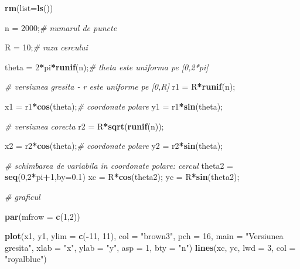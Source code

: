 \documentclass[]{article}
\newenvironment{Shaded}{\begin{snugshade}}{\end{snugshade}}
\newcommand{\KeywordTok}[1]{\textcolor[rgb]{0.13,0.29,0.53}{\textbf{#1}}}
\newcommand{\DataTypeTok}[1]{\textcolor[rgb]{0.13,0.29,0.53}{#1}}
\newcommand{\DecValTok}[1]{\textcolor[rgb]{0.00,0.00,0.81}{#1}}
\newcommand{\FloatTok}[1]{\textcolor[rgb]{0.00,0.00,0.81}{#1}}
\newcommand{\StringTok}[1]{\textcolor[rgb]{0.31,0.60,0.02}{#1}}
\newcommand{\CommentTok}[1]{\textcolor[rgb]{0.56,0.35,0.01}{\textit{#1}}}
\newcommand{\OperatorTok}[1]{\textcolor[rgb]{0.81,0.36,0.00}{\textbf{#1}}}
\newcommand{\NormalTok}[1]{#1}
\begin{document}
\begin{Shaded}
\begin{Highlighting}[]
\KeywordTok{rm}\NormalTok{(}\DataTypeTok{list=}\KeywordTok{ls}\NormalTok{())}

\NormalTok{n =}\StringTok{ }\DecValTok{2000}\NormalTok{;}\CommentTok{# numarul de puncte}

\NormalTok{R =}\StringTok{ }\DecValTok{10}\NormalTok{;}\CommentTok{# raza cercului }

\NormalTok{theta =}\StringTok{ }\DecValTok{2}\OperatorTok{*}\NormalTok{pi}\OperatorTok{*}\KeywordTok{runif}\NormalTok{(n);}\CommentTok{# theta este uniforma pe [0,2*pi]}

\CommentTok{# versiunea gresita - r este uniforme pe [0,R]}
\NormalTok{r1 =}\StringTok{ }\NormalTok{R}\OperatorTok{*}\KeywordTok{runif}\NormalTok{(n);}

\NormalTok{x1 =}\StringTok{ }\NormalTok{r1}\OperatorTok{*}\KeywordTok{cos}\NormalTok{(theta);}\CommentTok{# coordonate polare}
\NormalTok{y1 =}\StringTok{ }\NormalTok{r1}\OperatorTok{*}\KeywordTok{sin}\NormalTok{(theta);}

\CommentTok{# versiunea corecta}
\NormalTok{r2 =}\StringTok{ }\NormalTok{R}\OperatorTok{*}\KeywordTok{sqrt}\NormalTok{(}\KeywordTok{runif}\NormalTok{(n));}

\NormalTok{x2 =}\StringTok{ }\NormalTok{r2}\OperatorTok{*}\KeywordTok{cos}\NormalTok{(theta);}\CommentTok{# coordonate polare}
\NormalTok{y2 =}\StringTok{ }\NormalTok{r2}\OperatorTok{*}\KeywordTok{sin}\NormalTok{(theta);}

\CommentTok{# schimbarea de variabila in coordonate polare: cercul}
\NormalTok{theta2 =}\StringTok{ }\KeywordTok{seq}\NormalTok{(}\DecValTok{0}\NormalTok{,}\DecValTok{2}\OperatorTok{*}\NormalTok{pi}\OperatorTok{+}\DecValTok{1}\NormalTok{,}\DataTypeTok{by=}\FloatTok{0.1}\NormalTok{) }
\NormalTok{xc =}\StringTok{ }\NormalTok{R}\OperatorTok{*}\KeywordTok{cos}\NormalTok{(theta2);}
\NormalTok{yc =}\StringTok{ }\NormalTok{R}\OperatorTok{*}\KeywordTok{sin}\NormalTok{(theta2);}

\CommentTok{# graficul}

\KeywordTok{par}\NormalTok{(}\DataTypeTok{mfrow =} \KeywordTok{c}\NormalTok{(}\DecValTok{1}\NormalTok{,}\DecValTok{2}\NormalTok{))}

\KeywordTok{plot}\NormalTok{(x1, y1,}
     \DataTypeTok{ylim =} \KeywordTok{c}\NormalTok{(}\OperatorTok{-}\DecValTok{11}\NormalTok{, }\DecValTok{11}\NormalTok{),}
     \DataTypeTok{col =} \StringTok{"brown3"}\NormalTok{, }\DataTypeTok{pch =} \DecValTok{16}\NormalTok{,}
     \DataTypeTok{main =} \StringTok{"Versiunea gresita"}\NormalTok{, }\DataTypeTok{xlab =} \StringTok{"x"}\NormalTok{, }\DataTypeTok{ylab =} \StringTok{"y"}\NormalTok{, }\DataTypeTok{asp =} \DecValTok{1}\NormalTok{, }\DataTypeTok{bty =} \StringTok{"n"}\NormalTok{)}
\KeywordTok{lines}\NormalTok{(xc, yc, }\DataTypeTok{lwd =} \DecValTok{3}\NormalTok{, }\DataTypeTok{col =} \StringTok{"royalblue"}\NormalTok{)}


\end{Highlighting}
\end{Shaded}
\end{document}
